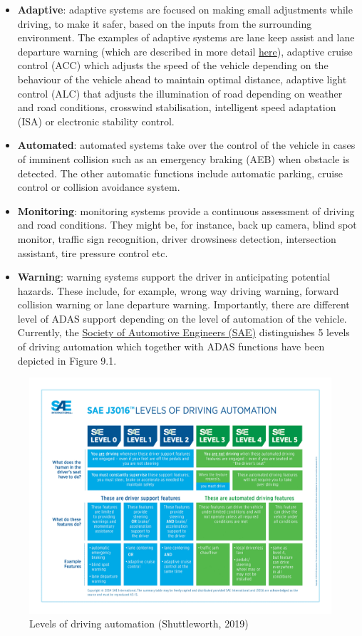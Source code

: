 \documentclass[
]{book}
\providecommand{\tightlist}{%
  \setlength{\itemsep}{0pt}\setlength{\parskip}{0pt}}
\begin{document}
\begin{itemize}
\tightlist
\item
  \textbf{Adaptive}: adaptive systems are focused on making small adjustments while driving, to make it safer, based on the inputs from the surrounding environment. The examples of adaptive systems are lane keep assist and lane departure warning (which are described in more detail \protect\hyperlink{lane_keeping}{here}), adaptive cruise control (ACC) which adjusts the speed of the vehicle depending on the behaviour of the vehicle ahead to maintain optimal distance, adaptive light control (ALC) that adjusts the illumination of road depending on weather and road conditions, crosswind stabilisation, intelligent speed adaptation (ISA) or electronic stability control.
\item
  \textbf{Automated}: automated systems take over the control of the vehicle in cases of imminent collision such as an emergency braking (AEB) when obstacle is detected. The other automatic functions include automatic parking, cruise control or collision avoidance system.
\item
  \textbf{Monitoring}: monitoring systems provide a continuous assessment of driving and road conditions. They might be, for instance, back up camera, blind spot monitor, traffic sign recognition, driver drowsiness detection, intersection assistant, tire pressure control etc.
\item
  \textbf{Warning}: warning systems support the driver in anticipating potential hazards. These include, for example, wrong way driving warning, forward collision warning or lane departure warning.
  Importantly, there are different level of ADAS support depending on the level of automation of the vehicle. Currently, the \href{sae.org}{Society of Automotive Engineers (SAE)} distinguishes 5 levels of driving automation which together with ADAS functions have been depicted in Figure 9.1.
\end{itemize}

\begin{figure}
\includegraphics[width=0.9\linewidth]{image/adas_level} \caption{Levels of driving automation (Shuttleworth, 2019)}\label{fig:unnamed-chunk-11}
\end{figure}
\end{document}
